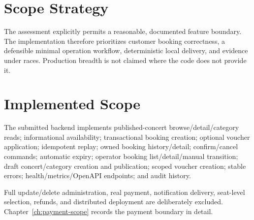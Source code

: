 \section{Scope Strategy}
The assessment explicitly permits a reasonable, documented feature boundary.
The implementation therefore prioritizes customer
booking correctness, a defensible minimal operation workflow, deterministic
local delivery, and evidence under races. Production breadth is not claimed
where the code does not provide it.

\section{Implemented Scope}
The submitted backend implements published-concert browse/detail/category
reads; informational availability; transactional booking creation; optional
voucher application; idempotent replay; owned booking history/detail;
confirm/cancel commands; automatic expiry; operator booking list/detail/manual
transition; draft concert/category creation and publication; scoped voucher
creation; stable errors; health/metrics/OpenAPI endpoints; and audit history.

Full update/delete administration, real payment, notification delivery,
seat-level selection, refunds, and distributed deployment are deliberately
excluded. Chapter~\ref{ch:payment-scope} records the payment boundary in detail.

